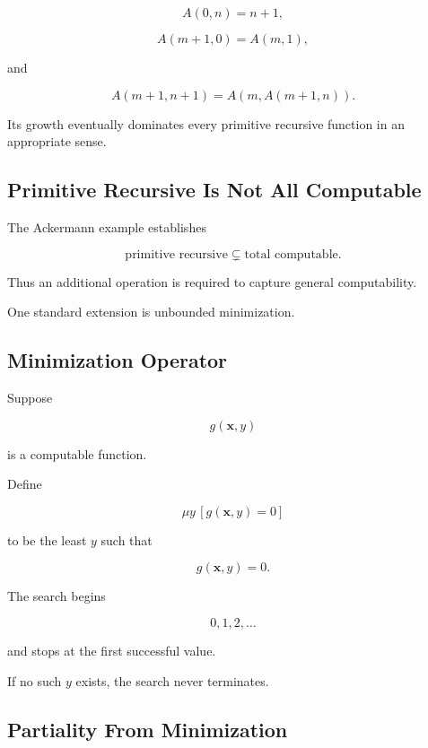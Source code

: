 \[
A(0,n)
=
n+1,
\]

\[
A(m+1,0)
=
A(m,1),
\]

and

\[
A(m+1,n+1)
=
A
\left(
m,
A(m+1,n)
\right).
\]

Its growth eventually dominates every primitive recursive function in an
appropriate sense.

\subsection{Primitive Recursive Is Not All Computable}
\label{subsec:primitive-recursive-not-all}

The Ackermann example establishes

\[
\boxed{
\text{primitive recursive}
\subsetneq
\text{total computable}.
}
\]

Thus an additional operation is required to capture general computability.

One standard extension is unbounded minimization.

\subsection{Minimization Operator}
\label{subsec:minimization-operator}

Suppose

\[
g(\mathbf{x},y)
\]

is a computable function.

Define

\[
\boxed{
\mu y
\,
[g(\mathbf{x},y)=0]
}
\]

to be the least \(y\) such that

\[
g(\mathbf{x},y)=0.
\]

The search begins

\[
0,1,2,\ldots
\]

and stops at the first successful value.

If no such \(y\) exists, the search never terminates.

\subsection{Partiality From Minimization}
\label{subsec:minimization-partiality}

